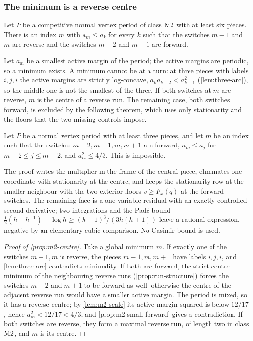 \subsubsection{The minimum is a reverse centre}\label{sec:m2-centre}

\begin{proposition}\label{prop:m2-centre}
Let $P$ be a competitive normal vertex period of class $\mathrm{M2}$ with at least six pieces. There is
an index $m$ with $a_m\le a_k$ for every $k$ such that the switches $m-1$ and $m$ are reverse and the
switches $m-2$ and $m+1$ are forward.
\end{proposition}

Let $a_m$ be a smallest active margin of the period; the active margins are periodic, so a minimum
exists. A minimum cannot be at a turn: at three pieces with labels $i,j,i$ the active margins are
strictly log-concave, $a_{k}a_{k+2}<a_{k+1}^2$ (\cref{lem:three-arc}), so the middle one is not the
smallest of the three. If both switches at $m$ are reverse, $m$ is the centre of a reverse run. The
remaining case, both switches forward, is excluded by the following theorem, which uses only
stationarity and the floors that the two missing controls impose.

\begin{proposition}\label{prop:m2-small-forward}
Let $P$ be a normal vertex period with at least three pieces, and let $m$ be an index such that the
switches $m-2,m-1,m,m+1$ are forward, $a_m\le a_j$ for $m-2\le j\le m+2$, and $a_m^2\le4/3$. This is
impossible.
\end{proposition}

The proof writes the multiplier in the frame of
the central piece, eliminates one coordinate with stationarity at the centre, and keeps the
stationarity row at the smaller neighbour with the two exterior floors $v\ge F_x(q)$ at the forward
switches. The remaining face is a one-variable residual with an exactly controlled second
derivative; two integrations and the Pad\'e bound $\frac12(h-h^{-1})-\log h\ge (h-1)^3/(3h(h+1))$
leave a rational expression, negative by an elementary cubic comparison. No Casimir bound is used.

\begin{proof}[Proof of \cref{prop:m2-centre}]
Take a global minimum $m$. If exactly one of the switches $m-1,m$ is reverse, the pieces $m-1,m,m+1$
have labels $i,j,i$, and \cref{lem:three-arc} contradicts minimality. If both are forward, the
strict centre minimum of the neighbouring reverse runs (\cref{prop:run-structure}) forces the
switches $m-2$ and $m+1$ to be forward as well: otherwise the centre of the adjacent reverse run
would have a smaller active margin. The period is mixed, so it has a reverse centre; by
\cref{lem:m2-scale} its active margin squared is below $12/17$, hence $a_m^2<12/17<4/3$, and
\cref{prop:m2-small-forward} gives a contradiction. If both switches are reverse, they form a
maximal reverse run, of length two in class $\mathrm{M2}$, and $m$ is its centre.
\end{proof}

